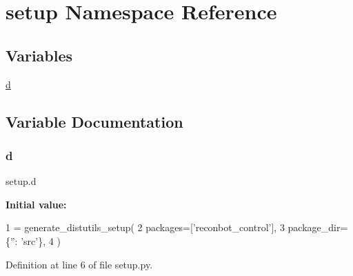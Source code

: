 \hypertarget{namespacesetup}{}\section{setup Namespace Reference}
\label{namespacesetup}
\subsection*{Variables}
\begin{DoxyCompactItemize}
\item 
\hyperlink{namespacesetup_aa2586b6c4dd84a0aaaf49cb1565cee6e}{d}
\end{DoxyCompactItemize}


\subsection{Variable Documentation}
\mbox{\label{namespacesetup_aa2586b6c4dd84a0aaaf49cb1565cee6e}} 
\subsubsection{\texorpdfstring{d}{d}}
{\footnotesize\ttfamily setup.\+d}

{\bfseries Initial value\+:}
\begin{DoxyCode}
1 =  generate\_distutils\_setup(
2     packages=[\textcolor{stringliteral}{'reconbot\_control'}],
3     package\_dir=\{\textcolor{stringliteral}{''}: \textcolor{stringliteral}{'src'}\},
4     )
\end{DoxyCode}


Definition at line 6 of file setup.\+py.

